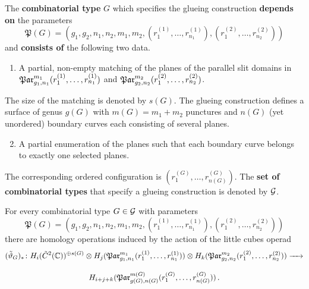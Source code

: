 \begin{defi*}[B., H.]
    The {\bf combinatorial type} $G$ which specifies the glueing construction {\bf depends on} the parameters
    \[
        \mathfrak P(G) = (g_1, g_2, n_1, n_2, m_1, m_2, (r_1^{(1)}, \ldots, r_{n_1}^{(1)}), (r_1^{(2)}, \ldots, r_{n_2}^{(2)}))
    \]
    and {\bf consists of} the following two data.
    \begin{enumerate}
        \item A partial, non-empty matching of the planes of the parallel slit domains in $\Par_{g_1, n_1}^{m_1}(r_1^{(1)}, \ldots, r_{n_1}^{(1)})$ and $\Par_{g_2, n_2}^{m_2}(r_1^{(2)}, \ldots, r_{n_2}^{(2)})$.
    \end{enumerate}
    The size of the matching is denoted by $s(G)$.
    The glueing construction defines a surface of genus $g(G)$ with $m(G) = m_1 + m_2$ punctures and $n(G)$ (yet unordered) boundary curves each consisting of several planes.
    \begin{enumerate}
        \setcounter{enumi}{1}
        \item A partial enumeration of the planes such that each boundary curve belongs to exactly one selected planes.
    \end{enumerate}
    The corresponding ordered configuration is $(r^{(G)}_1, \ldots, r^{(G)}_{n(G)})$.
    The {\bf set of combinatorial types} that specify a glueing construction is denoted by $\mathcal{G}$.
\end{defi*}
\begin{prop*}[Bödigheimer]
    For every combinatorial type $G \in \mathcal{G}$ with parameters
    \[
        \mathfrak P(G) = (g_1, g_2, n_1, n_2, m_1, m_2, (r_1^{(1)}, \ldots, r_{n_1}^{(1)}), (r_1^{(2)}, \ldots, r_{n_2}^{(2)}))
    \]
    there are homology operations induced by the action of the little cubes operad
    \begin{multline*}
        (\tilde\vartheta_G)_\ast \colon 
            H_i(\cspc 2(\C))^{\oplus s(G)} \otimes
            H_j(\Par_{g_1, n_1}^{m_1}(r_1^{(1)}, \ldots, r_{n_1}^{(1)})) \otimes
            H_k(\Par_{g_2, n_2}^{m_2}(r_1^{(2)}, \ldots, r_{n_2}^{(2)})) \to\\[10pt]
            H_{i+j+k}(\Par_{g(G), n(G)}^{m(G)}(r^{(G)}_1, \ldots, r^{(G)}_{n(G)}))\,.
    \end{multline*}
\end{prop*}

